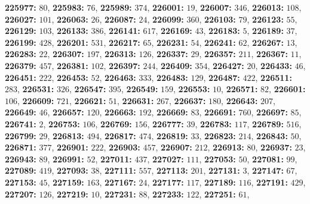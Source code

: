 \textsf{\bfseries 225977:} $80$, \textsf{\bfseries 225983:} $76$, \textsf{\bfseries 225989:} $374$, \textsf{\bfseries 226001:} $19$, \textsf{\bfseries 226007:} $346$, \textsf{\bfseries 226013:} $108$, \textsf{\bfseries 226027:} $101$, \textsf{\bfseries 226063:} $26$, \textsf{\bfseries 226087:} $24$, \textsf{\bfseries 226099:} $360$, \textsf{\bfseries 226103:} $79$, \textsf{\bfseries 226123:} $55$, \textsf{\bfseries 226129:} $103$, \textsf{\bfseries 226133:} $386$, \textsf{\bfseries 226141:} $617$, \textsf{\bfseries 226169:} $43$, \textsf{\bfseries 226183:} $5$, \textsf{\bfseries 226189:} $37$, \textsf{\bfseries 226199:} $428$, \textsf{\bfseries 226201:} $531$, \textsf{\bfseries 226217:} $65$, \textsf{\bfseries 226231:} $54$, \textsf{\bfseries 226241:} $62$, \textsf{\bfseries 226267:} $13$, \textsf{\bfseries 226283:} $22$, \textsf{\bfseries 226307:} $197$, \textsf{\bfseries 226313:} $126$, \textsf{\bfseries 226337:} $29$, \textsf{\bfseries 226357:} $211$, \textsf{\bfseries 226367:} $11$, \textsf{\bfseries 226379:} $457$, \textsf{\bfseries 226381:} $102$, \textsf{\bfseries 226397:} $244$, \textsf{\bfseries 226409:} $354$, \textsf{\bfseries 226427:} $20$, \textsf{\bfseries 226433:} $46$, \textsf{\bfseries 226451:} $222$, \textsf{\bfseries 226453:} $52$, \textsf{\bfseries 226463:} $333$, \textsf{\bfseries 226483:} $129$, \textsf{\bfseries 226487:} $422$, \textsf{\bfseries 226511:} $283$, \textsf{\bfseries 226531:} $326$, \textsf{\bfseries 226547:} $395$, \textsf{\bfseries 226549:} $159$, \textsf{\bfseries 226553:} $10$, \textsf{\bfseries 226571:} $82$, \textsf{\bfseries 226601:} $106$, \textsf{\bfseries 226609:} $721$, \textsf{\bfseries 226621:} $51$, \textsf{\bfseries 226631:} $267$, \textsf{\bfseries 226637:} $180$, \textsf{\bfseries 226643:} $207$, \textsf{\bfseries 226649:} $46$, \textsf{\bfseries 226657:} $120$, \textsf{\bfseries 226663:} $192$, \textsf{\bfseries 226669:} $83$, \textsf{\bfseries 226691:} $760$, \textsf{\bfseries 226697:} $85$, \textsf{\bfseries 226741:} $2$, \textsf{\bfseries 226753:} $106$, \textsf{\bfseries 226769:} $156$, \textsf{\bfseries 226777:} $39$, \textsf{\bfseries 226783:} $117$, \textsf{\bfseries 226789:} $516$, \textsf{\bfseries 226799:} $29$, \textsf{\bfseries 226813:} $494$, \textsf{\bfseries 226817:} $474$, \textsf{\bfseries 226819:} $33$, \textsf{\bfseries 226823:} $214$, \textsf{\bfseries 226843:} $50$, \textsf{\bfseries 226871:} $377$, \textsf{\bfseries 226901:} $222$, \textsf{\bfseries 226903:} $457$, \textsf{\bfseries 226907:} $212$, \textsf{\bfseries 226913:} $80$, \textsf{\bfseries 226937:} $23$, \textsf{\bfseries 226943:} $89$, \textsf{\bfseries 226991:} $52$, \textsf{\bfseries 227011:} $437$, \textsf{\bfseries 227027:} $111$, \textsf{\bfseries 227053:} $50$, \textsf{\bfseries 227081:} $99$, \textsf{\bfseries 227089:} $419$, \textsf{\bfseries 227093:} $38$, \textsf{\bfseries 227111:} $557$, \textsf{\bfseries 227113:} $201$, \textsf{\bfseries 227131:} $3$, \textsf{\bfseries 227147:} $67$, \textsf{\bfseries 227153:} $45$, \textsf{\bfseries 227159:} $163$, \textsf{\bfseries 227167:} $24$, \textsf{\bfseries 227177:} $117$, \textsf{\bfseries 227189:} $116$, \textsf{\bfseries 227191:} $429$, \textsf{\bfseries 227207:} $126$, \textsf{\bfseries 227219:} $10$, \textsf{\bfseries 227231:} $88$, \textsf{\bfseries 227233:} $122$, \textsf{\bfseries 227251:} $61$, 

